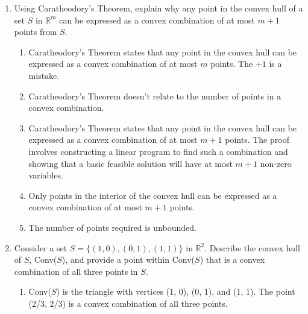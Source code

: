 \documentclass{article}%
\begin{document}
\begin{enumerate}
\begin{enumerate}
\item The convex hull is defined as the intersection of all convex sets containing $S$. Since it's an intersection of convex sets, it's convex, and it contains $S$ by definition. Any smaller convex set containing $S$ would have to be a subset of this intersection, making Conv($S$) the smallest.%
\item The convex hull is not necessarily the smallest convex set containing $S$.%
\item The convex hull is only the smallest convex set containing $S$ if $S$ is finite.%
\item The convex hull is only defined for convex sets $S$.%
\end{enumerate}%
\vspace{1em}%
\item Using Caratheodory's Theorem, explain why any point in the convex hull of a set $S$ in $\mathbb{R}^m$ can be expressed as a convex combination of at most $m+1$ points from $S$.%
\begin{enumerate}%
\item Caratheodory's Theorem states that any point in the convex hull can be expressed as a convex combination of at most $m$ points.  The $+1$ is a mistake.%
\item Caratheodory's Theorem doesn't relate to the number of points in a convex combination.%
\item Caratheodory's Theorem states that any point in the convex hull can be expressed as a convex combination of at most $m+1$ points. The proof involves constructing a linear program to find such a combination and showing that a basic feasible solution will have at most $m+1$ non-zero variables.%
\item Only points in the interior of the convex hull can be expressed as a convex combination of at most $m+1$ points.%
\item The number of points required is unbounded.%
\end{enumerate}%
\vspace{1em}%
\item Consider a set $S = \{(1, 0), (0, 1), (1, 1)\}$ in $\mathbb{R}^2$.  Describe the convex hull of $S$, Conv($S$), and provide a point within Conv($S$) that is a convex combination of all three points in $S$.%
\begin{enumerate}%
\item Conv($S$) is the triangle with vertices (1, 0), (0, 1), and (1, 1).  The point (2/3, 2/3) is a convex combination of all three points.%

\end{enumerate}
\end{enumerate}
\end{document}

